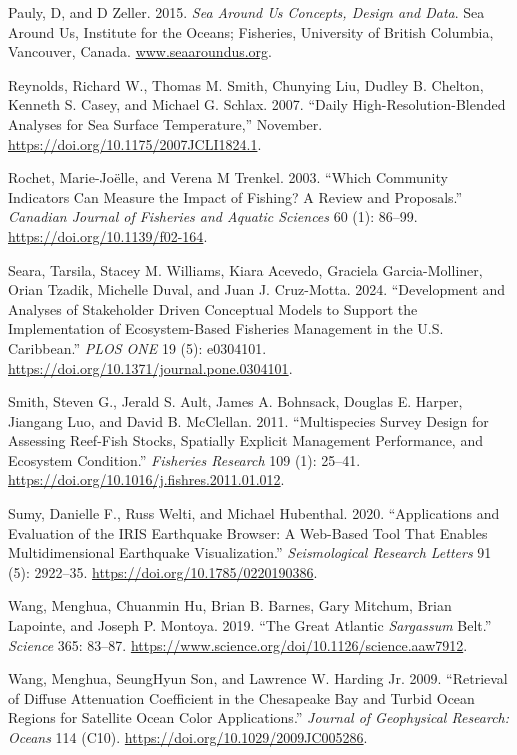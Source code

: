 \documentclass[
  letterpaper,
  oneside,
  open=any]{scrbook}
\newlength{\cslhangindent}
\newenvironment{CSLReferences}[2] %
 {\begin{list}{}{%
  \setlength{\itemindent}{0pt}
  \setlength{\leftmargin}{0pt}
  \setlength{\parsep}{0pt}
  \ifodd #1
   \setlength{\leftmargin}{\cslhangindent}
   \setlength{\itemindent}{-1\cslhangindent}
  \fi
  \setlength{\itemsep}{#2\baselineskip}}}
 {\end{list}}
\begin{document}
\begin{CSLReferences}{1}{0}
Pauly, D, and D Zeller. 2015. \emph{Sea Around Us Concepts, Design and
Data}. Sea Around Us, Institute for the Oceans; Fisheries, University of
British Columbia, Vancouver, Canada.
\href{https://www.seaaroundus.org}{www.seaaroundus.org}.

Reynolds, Richard W., Thomas M. Smith, Chunying Liu, Dudley B. Chelton,
Kenneth S. Casey, and Michael G. Schlax. 2007. {``Daily
High-Resolution-Blended Analyses for Sea Surface Temperature,''}
November. \url{https://doi.org/10.1175/2007JCLI1824.1}.

Rochet, Marie-Joëlle, and Verena M Trenkel. 2003. {``Which Community
Indicators Can Measure the Impact of Fishing? A Review and Proposals.''}
\emph{Canadian Journal of Fisheries and Aquatic Sciences} 60 (1):
86--99. \url{https://doi.org/10.1139/f02-164}.

Seara, Tarsila, Stacey M. Williams, Kiara Acevedo, Graciela
Garcia-Molliner, Orian Tzadik, Michelle Duval, and Juan J. Cruz-Motta.
2024. {``Development and Analyses of Stakeholder Driven Conceptual
Models to Support the Implementation of Ecosystem-Based Fisheries
Management in the U.S. Caribbean.''} \emph{PLOS ONE} 19 (5): e0304101.
\url{https://doi.org/10.1371/journal.pone.0304101}.

Smith, Steven G., Jerald S. Ault, James A. Bohnsack, Douglas E. Harper,
Jiangang Luo, and David B. McClellan. 2011. {``Multispecies Survey
Design for Assessing Reef-Fish Stocks, Spatially Explicit Management
Performance, and Ecosystem Condition.''} \emph{Fisheries Research} 109
(1): 25--41. \url{https://doi.org/10.1016/j.fishres.2011.01.012}.

Sumy, Danielle F., Russ Welti, and Michael Hubenthal. 2020.
{``Applications and Evaluation of the IRIS Earthquake Browser: A
Web{-}Based Tool That Enables Multidimensional Earthquake
Visualization.''} \emph{Seismological Research Letters} 91 (5):
2922--35. \url{https://doi.org/10.1785/0220190386}.

Wang, Menghua, Chuanmin Hu, Brian B. Barnes, Gary Mitchum, Brian
Lapointe, and Joseph P. Montoya. 2019. {``The Great Atlantic
{\emph{Sargassum}} Belt.''} \emph{Science} 365: 83--87.
\url{https://www.science.org/doi/10.1126/science.aaw7912}.

Wang, Menghua, SeungHyun Son, and Lawrence W. Harding Jr. 2009.
{``Retrieval of Diffuse Attenuation Coefficient in the Chesapeake Bay
and Turbid Ocean Regions for Satellite Ocean Color Applications.''}
\emph{Journal of Geophysical Research: Oceans} 114 (C10).
\url{https://doi.org/10.1029/2009JC005286}.

\end{CSLReferences}


\backmatter
\end{document}
